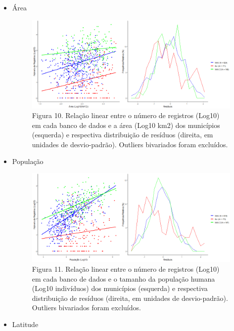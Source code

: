 \begin{itemize}
\begin{itemize}
\item Área


\begin{figure}[h!]
\centering
\includegraphics[width = 15cm]{Imagens/31213.png}
\\{\scriptsize Figura 10. Relação linear entre o número de registros (Log10) em cada banco de dados e a área (Log10 km2) dos municípios (esquerda) e respectiva distribuição de resíduos (direita, em unidades de desvio-padrão). Outliers bivariados foram excluídos.}
\end{figure}

\item População

\begin{figure}[h!]
\centering
\includegraphics[width = 15cm]{Imagens/31313.png}
\\{\scriptsize Figura 11. Relação linear entre o número de registros (Log10) em cada banco de dados e o tamanho da população humana (Log10 indivíduos) dos municípios (esquerda) e respectiva distribuição de resíduos (direita, em unidades de desvio-padrão). Outliers bivariados foram excluídos.}
\end{figure}

\newpage

\item Latitude


\end{itemize}
\end{itemize}
